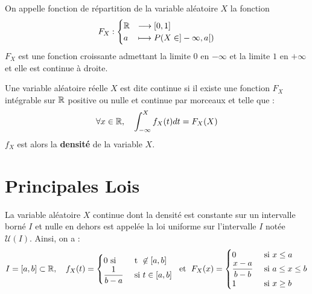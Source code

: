 \vspace{5cm}

\begin{definition}
    On appelle fonction de répartition de la variable aléatoire $X$ la fonction 
    \[ F_X : 
        \begin{cases}
            \mathbb{R} &\longrightarrow [0, 1] \\
            a &\longmapsto P(X \in ]- \infty, a[)
        \end{cases}
    \]
    $F_X$ est une fonction croissante admettant la limite $0$ en $- \infty$ et la limite $1$ en $+ \infty$ et elle est continue à droite. 
\end{definition}

\begin{definition}
Une variable aléatoire réelle $X$ est dite continue si il existe une fonction $F_X$ intégrable sur $\mathbb{R}$ positive ou nulle et continue par morceaux 
    et telle que :
    \[ \forall x \in \mathbb{R}, \quad \int_{- \infty}^{X} f_X(t) dt = F_X(X) \]
    $f_X$ est alors la \textbf{densité} de la variable $X$.
\end{definition}


\section*{Principales Lois}

\begin{definition}
    La variable aléatoire $X$ continue dont la densité est constante sur un intervalle borné $I$ et nulle en dehors est appelée la loi uniforme sur l'intervalle $I$ notée $\mathcal{U}(I)$.
    Ainsi, on a :
        \[ I = [a, b] \subset \mathbb{R}, \quad f_X(t) = 
            \begin{cases}
                0 \text{ si } & \text{ t } \not \in [a, b] \\
                \dfrac{1}{b-a} & \text{ si } t \in [a, b]
            \end{cases}
            \; \text{ et } \; 
            F_X(x) = 
            \begin{cases}
                0 & \text{ si } x \leq a \\
                \dfrac{x - a}{b - b} & \text{ si } a \leq x \leq b \\
                1 & \text{ si } x \geq b 
            \end{cases}
        \]    
\end{definition}


